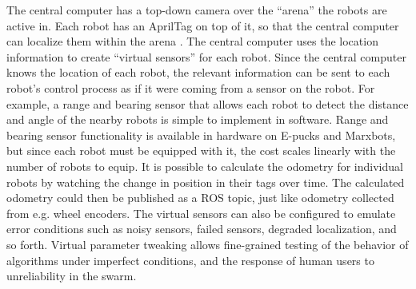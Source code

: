 The central computer has a top-down camera over the ``arena'' the robots are active in. 
Each robot has an AprilTag on top of it, so that the central computer can localize them within the arena \citep{olson2011tags}. 
The central computer uses the location information to create ``virtual sensors'' for each robot. 
Since the central computer knows the location of each robot, the relevant information can be sent to each robot's control process as if it were coming from a sensor on the robot. 
For example, a range and bearing sensor that allows each robot to detect the distance and angle of the nearby robots is simple to implement in software. 
Range and bearing sensor functionality is available in hardware on E-pucks and Marxbots, but since each robot must be equipped with it, the cost scales linearly with the number of robots to equip.  
It is possible to calculate the odometry for individual robots by watching the change in position in their tags over time. 
The calculated odometry could then be published as a ROS topic, just like odometry collected from e.g. wheel encoders. 
The virtual sensors can also be configured to emulate error conditions such as noisy sensors, failed sensors, degraded localization, and so forth.
Virtual parameter tweaking allows fine-grained testing of the behavior of algorithms under imperfect conditions, and the response of human users to unreliability in the swarm. 

